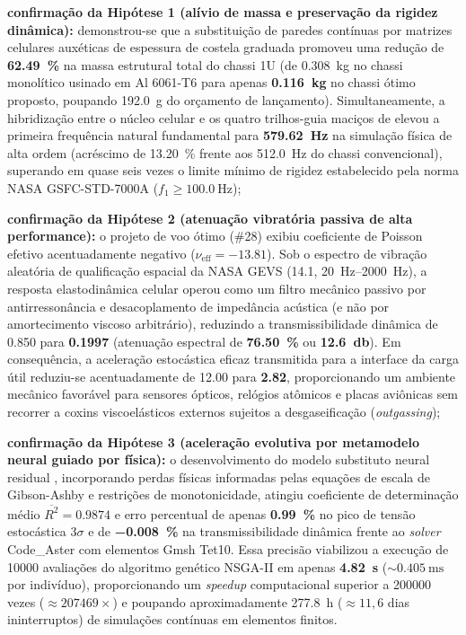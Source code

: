 \begin{alineas}
  \item \textbf{confirmação da Hipótese 1 (alívio de massa e preservação da rigidez dinâmica):} demonstrou-se que a substituição de paredes contínuas por matrizes celulares auxéticas de espessura de costela graduada promoveu uma redução de \textbf{\SI{62.49}{\percent}} na massa estrutural total do chassi 1U (de \SI{0.308}{\kilo\gram} no chassi monolítico usinado em Al 6061-T6 para apenas \textbf{\SI{0.116}{\kilo\gram}} no chassi ótimo proposto, poupando \SI{192.0}{\gram} do orçamento de lançamento). Simultaneamente, a hibridização entre o núcleo celular e os quatro trilhos-guia maciços de \rail{} elevou a primeira frequência natural fundamental para \textbf{\SI{579.62}{\hertz}} na simulação física de alta ordem (acréscimo de \SI{+13.20}{\percent} frente aos \SI{512.0}{\hertz} do chassi convencional), superando em quase seis vezes o limite mínimo de rigidez estabelecido pela norma NASA GSFC-STD-7000A ($f_1 \ge \SI{100.0}{\hertz}$);
  
  \item \textbf{confirmação da Hipótese 2 (atenuação vibratória passiva de alta performance):} o projeto de voo ótimo (\#28) exibiu coeficiente de Poisson efetivo acentuadamente negativo ($\nu_{\text{eff}} = \num{-13.81}$). Sob o espectro de vibração aleatória de qualificação espacial da NASA GEVS (\SI{14.1}{\Grms}, \SIrange{20}{2000}{\hertz}), a resposta elastodinâmica celular operou como um filtro mecânico passivo por antirressonância e desacoplamento de impedância acústica (e não por amortecimento viscoso arbitrário), reduzindo a transmissibilidade dinâmica de \num{0.850} para \textbf{\num{0.1997}} (atenuação espectral de \textbf{\SI{76.50}{\percent}} ou \textbf{\SI{12.6}{\decibel}}). Em consequência, a aceleração estocástica eficaz transmitida para a interface da carga útil reduziu-se acentuadamente de \SI{12.00}{\Grms} para \textbf{\SI{2.82}{\Grms}}, proporcionando um ambiente mecânico favorável para sensores ópticos, relógios atômicos e placas aviônicas sem recorrer a coxins viscoelásticos externos sujeitos a desgaseificação (\textit{outgassing});
  
  \item \textbf{confirmação da Hipótese 3 (aceleração evolutiva por metamodelo neural guiado por física):} o desenvolvimento do modelo substituto neural residual , incorporando perdas físicas informadas pelas equações de escala de Gibson-Ashby e restrições de monotonicidade, atingiu coeficiente de determinação médio $\overline{R^2} = \num{0.9874}$ e erro percentual de apenas \textbf{\SI{+0.99}{\percent}} no pico de tensão estocástica $3\sigma$ e de \textbf{\SI{-0.008}{\percent}} na transmissibilidade dinâmica frente ao \textit{solver} Code\_Aster com elementos Gmsh Tet10. Essa precisão viabilizou a execução de \num{10000} avaliações do algoritmo genético NSGA-II em apenas \textbf{\SI{4.82}{\second}} ($\sim \SI{0.405}{\milli\second}$ por indivíduo), proporcionando um \textit{speedup} computacional superior a \num{200000} vezes ($\approx \num{207469}\times$) e poupando aproximadamente \SI{277.8}{\hour} ($\approx 11{,}6$ dias ininterruptos) de simulações contínuas em elementos finitos.
\end{alineas}

